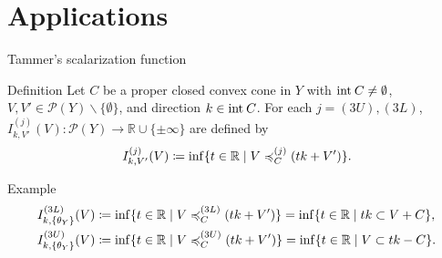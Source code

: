 \documentclass[aspectratio=169, dvipdfmx, 11pt]{beamer}
\newcommand{\RealNumberSet}{\mathbb{R}}
\newcommand{\Interior}[1]{\text{\rm int\:${#1}$}} %
\begin{document}
\section{Applications}

\begin{frame}{Tammer's scalarization function}
  \begin{block}{Definition \cite{MR2778674}}
    Let $C$ be a proper closed convex cone in $Y$ with $\Interior{C} \ne \emptyset$,
    $V, V' \in \mathcal{P}(Y) \backslash \{\emptyset\}$, and direction $k \in \Interior{C}$.
    For each $j = (3U), (3L)$, $I^{(j)}_{k, V'} (V) \colon \mathcal{P}(Y) \to \RealNumberSet \cup \{\pm \infty\}$
    are defined by
    \begin{equation}
      I^{(j)}_{k, V'} (V) \coloneq \inf\{ t \in \RealNumberSet \mid V \preccurlyeq_{C}^{(j)} (tk + V') \}. \notag
    \end{equation}
  \end{block}
  \begin{exampleblock}{Example}
    \begin{align}
      I^{(3L)}_{k, \{\theta_{Y}\}} (V) & \coloneq \inf\{ t \in \RealNumberSet \mid V \preccurlyeq_{C}^{(3L)} (tk + V') \}
      = \inf\{ t \in \RealNumberSet \mid tk \subset V + C \}, \notag                                                      \\
      I^{(3U)}_{k, \{\theta_{Y}\}} (V) & \coloneq \inf\{ t \in \RealNumberSet \mid V \preccurlyeq_{C}^{(3U)} (tk + V') \}
      = \inf\{ t \in \RealNumberSet \mid V \subset tk - C \}. \notag
    \end{align}
  \end{exampleblock}
\end{frame}
\end{document}
